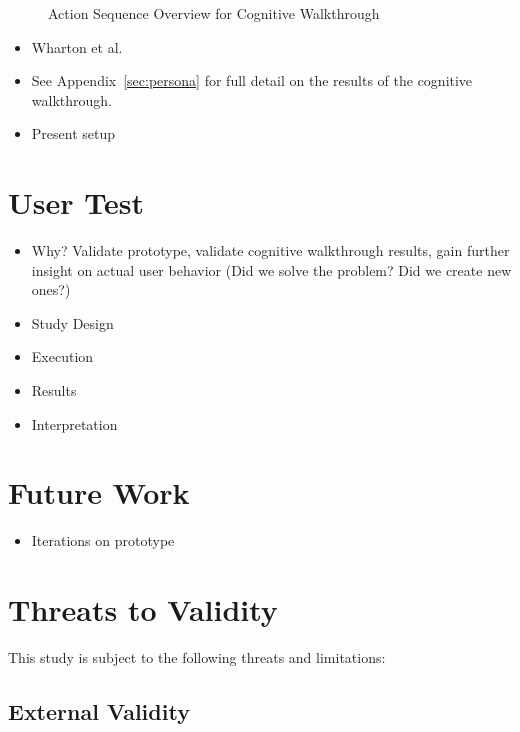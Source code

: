 \documentclass[sigplan,screen,nonacm,review]{acmart}
\begin{document}
\begin{figure}
	\centering
	\Description{}
	\caption{Action Sequence Overview for Cognitive Walkthrough}
	\label{fig:steps-prototype}
\end{figure}

\begin{itemize}
	\item Wharton et al. \cite{Wharton_Rieman_Clayton_Polson_1994}
	\item See Appendix~\ref{sec:persona} for full detail on the results of the cognitive walkthrough.
	\item Present setup
\end{itemize}


\section{User Test}

\begin{itemize}
	\item Why? Validate prototype, validate cognitive walkthrough results, gain further insight on actual user behavior (Did we solve the problem? Did we create new ones?)
	\item Study Design
	\item Execution
	\item Results
	\item Interpretation
\end{itemize}

\section{Future Work}
\label{sec:future}

\begin{itemize}
	\item Iterations on prototype
\end{itemize}

\section{Threats to Validity}
\label{sec:threats}

This study is subject to the following threats and limitations:

\subsection{External Validity}
\end{document}
